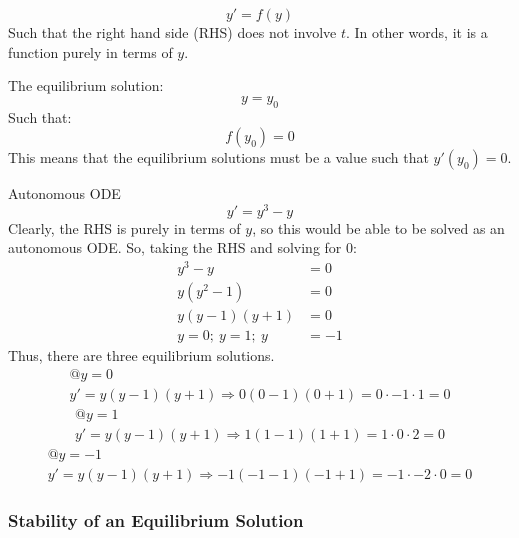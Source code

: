 \documentclass[12pt]{article}
\begin{document}
\begin{equation*}
  y' = f(y)
\end{equation*}
Such that the right hand side (RHS) does not involve $t$. In other words, it is a function purely in terms of $y$.

The equilibrium solution:
\begin{equation*}
  y = y_0
\end{equation*}
Such that:
\begin{equation*}
  f(y_0) = 0
\end{equation*}
This means that the equilibrium solutions must be a value such that $y'(y_0)=0$.
\begin{example}{Autonomous ODE}
  \begin{equation*}
    y' = y^3 - y
  \end{equation*}
  Clearly, the RHS is purely in terms of $y$, so this would be able to be solved as an autonomous ODE. So, taking the RHS and solving for $0$:
  \begin{align*}
    y^3 - y &= 0 \\
    y\left(y^2 - 1\right) &= 0 \\
    y\left(y - 1\right)\left(y + 1\right) &= 0 \\
    y = 0;\ y = 1;\ y &= -1
  \end{align*}
  Thus, there are three equilibrium solutions.
  \begin{gather*}
    @y=0\\
    y' = y\left(y - 1\right)\left(y + 1\right) \Rightarrow 0\left(0 - 1\right)\left(0 + 1\right) = 0 \cdot -1 \cdot 1 = 0
  \end{gather*}
  \begin{gather*}
    @y=1\\
    y' = y\left(y - 1\right)\left(y + 1\right) \Rightarrow 1\left(1 - 1\right)\left(1 + 1\right) = 1 \cdot 0 \cdot 2 = 0
  \end{gather*}
  \begin{gather*}
    @y=-1\\
    y' = y\left(y - 1\right)\left(y + 1\right) \Rightarrow -1\left(-1 - 1\right)\left(-1 + 1\right) = -1 \cdot -2 \cdot 0 = 0
  \end{gather*}
\end{example}

\subsubsection{Stability of an Equilibrium Solution}
\label{sssec:stabilityOfAnEqulibriumSolution}
\end{document}
